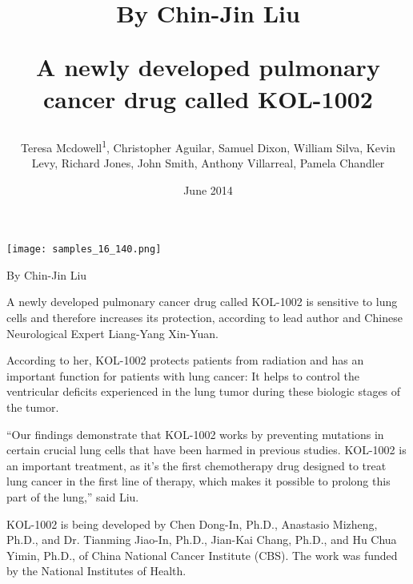 \documentclass{article}
\title{By Chin-Jin Liu

A newly developed pulmonary cancer drug called KOL-1002}
\author{Teresa Mcdowell\textsuperscript{1},  Christopher Aguilar,  Samuel Dixon,  William Silva,  Kevin Levy,  Richard Jones,  John Smith,  Anthony Villarreal,  Pamela Chandler}
\affil{\textsuperscript{1}University of California, San Francisco}
\date{June 2014}
\begin{document}
\maketitle

\begin{center}
\begin{minipage}{0.75\linewidth}
\texttt{[image: samples\_16\_140.png]}
\end{minipage}
\end{center}

By Chin-Jin Liu

A newly developed pulmonary cancer drug called KOL-1002 is sensitive to lung cells and therefore increases its protection, according to lead author and Chinese Neurological Expert Liang-Yang Xin-Yuan.

According to her, KOL-1002 protects patients from radiation and has an important function for patients with lung cancer: It helps to control the ventricular deficits experienced in the lung tumor during these biologic stages of the tumor.

“Our findings demonstrate that KOL-1002 works by preventing mutations in certain crucial lung cells that have been harmed in previous studies. KOL-1002 is an important treatment, as it’s the first chemotherapy drug designed to treat lung cancer in the first line of therapy, which makes it possible to prolong this part of the lung,” said Liu.

KOL-1002 is being developed by Chen Dong-In, Ph.D., Anastasio Mizheng, Ph.D., and Dr. Tianming Jiao-In, Ph.D., Jian-Kai Chang, Ph.D., and Hu Chua Yimin, Ph.D., of China National Cancer Institute (CBS). The work was funded by the National Institutes of Health.
\end{document}
